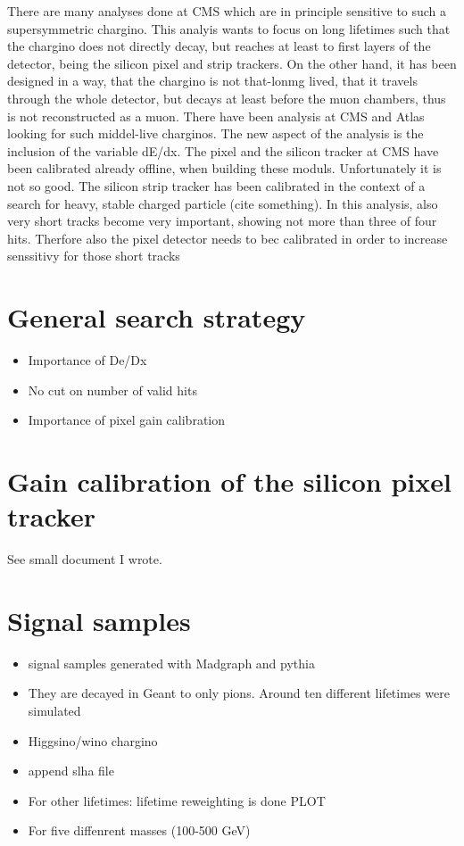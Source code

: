 There are many analyses done at CMS which are in principle sensitive to such a supersymmetric chargino. 
This analyis wants to focus on long lifetimes such that the chargino does not directly decay, but reaches at least to first layers of the detector, being the silicon pixel and strip trackers. 
On the other hand, it has been designed in a way, that the chargino is not that-lonmg lived, that it travels through the whole detector, but decays at least before the muon chambers, thus is not reconstructed as a muon.
There have been analysis at CMS and Atlas looking for such middel-live charginos. 
The new aspect of the analysis is the inclusion of the variable dE/dx.
The pixel and the silicon tracker at CMS have been calibrated already offline, when building these moduls. Unfortunately it is not so good.
The silicon strip tracker has been calibrated in the context of a search for heavy, stable charged particle (cite something).
In this analysis, also very short tracks become very important, showing not more than three of four hits. Therfore also the pixel detector needs to bec calibrated in order to increase senssitivy for those short tracks

\section{General search strategy}
\begin{itemize}
\item Importance of De/Dx 
\item No cut on number of valid hits
\item Importance of pixel gain calibration
\end{itemize}

\section{Gain calibration of the silicon pixel tracker}
See small document I wrote.

\section{Signal samples}
\begin{itemize}
\item signal samples generated with Madgraph and pythia
\item They are decayed in Geant to only pions. Around ten different lifetimes were simulated
\item Higgsino/wino chargino 
\item append slha file
\item For other lifetimes: lifetime reweighting is done PLOT
\item For five diffenrent masses (100-500 GeV) 
\end{itemize}

